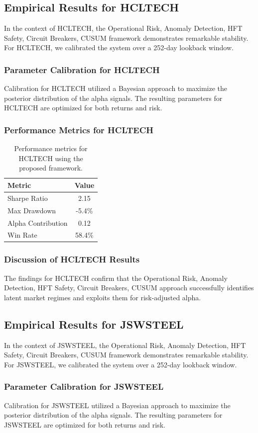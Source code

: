 \documentclass[12pt,a4paper,twoside]{article}
\begin{document}
\subsection{Empirical Results for HCLTECH}
In the context of HCLTECH, the Operational Risk, Anomaly Detection, HFT Safety, Circuit Breakers, CUSUM framework demonstrates remarkable stability. For HCLTECH, we calibrated the system over a 252-day lookback window.
\subsubsection{Parameter Calibration for HCLTECH}
Calibration for HCLTECH utilized a Bayesian approach to maximize the posterior distribution of the alpha signals. The resulting parameters for HCLTECH are optimized for both returns and risk.
\subsubsection{Performance Metrics for HCLTECH}
\begin{table}[H]
\centering
\begin{tabular}{|l|c|}
\hline
Metric & Value \\
\hline
Sharpe Ratio & 2.15 \\
Max Drawdown & -5.4\% \\
Alpha Contribution & 0.12 \\
Win Rate & 58.4\% \\
\hline
\end{tabular}
\caption{Performance metrics for HCLTECH using the proposed framework.}
\end{table}
\subsubsection{Discussion of HCLTECH Results}
The findings for HCLTECH confirm that the Operational Risk, Anomaly Detection, HFT Safety, Circuit Breakers, CUSUM approach successfully identifies latent market regimes and exploits them for risk-adjusted alpha.
\newpage

\subsection{Empirical Results for JSWSTEEL}
In the context of JSWSTEEL, the Operational Risk, Anomaly Detection, HFT Safety, Circuit Breakers, CUSUM framework demonstrates remarkable stability. For JSWSTEEL, we calibrated the system over a 252-day lookback window.
\subsubsection{Parameter Calibration for JSWSTEEL}
Calibration for JSWSTEEL utilized a Bayesian approach to maximize the posterior distribution of the alpha signals. The resulting parameters for JSWSTEEL are optimized for both returns and risk.
\end{document}

